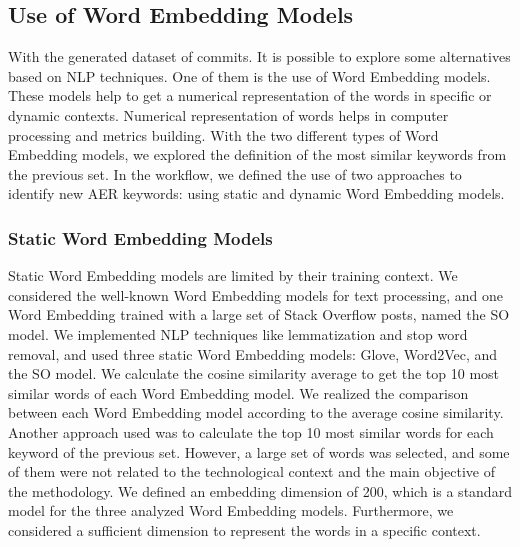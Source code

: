 \subsection{Use of Word Embedding Models}
With the generated dataset of commits. It is possible to explore some alternatives based on NLP techniques. One of them is the use of Word Embedding models. These models help to get a numerical representation of the words in specific or dynamic contexts. Numerical representation of words helps in computer processing and metrics building. With the two different types of Word Embedding models, we explored the definition of the most similar keywords from the previous set. In the workflow, we defined the use of two approaches to identify new AER keywords: using static and dynamic Word Embedding models.

\subsubsection{Static Word Embedding Models}
Static Word Embedding models are limited by their training context. We considered the well-known Word Embedding models for text processing, and one Word Embedding trained with a large set of Stack Overflow posts, named the SO model. We implemented NLP techniques like lemmatization and stop word removal, and used three static Word Embedding models: Glove, Word2Vec, and the SO model. We calculate the cosine similarity average to get the top 10 most similar words of each Word Embedding model. We realized the comparison between each Word Embedding model according to the average cosine similarity. Another approach used was to calculate the top 10 most similar words for each keyword of the previous set. However, a large set of words was selected, and some of them were not related to the technological context and the main objective of the methodology. We defined an embedding dimension of 200, which is a standard model for the three analyzed Word Embedding models. Furthermore, we considered a sufficient dimension to represent the words in a specific context.


